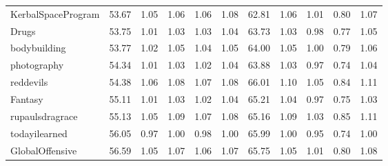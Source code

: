 \begin{tabular}{lrrrrrrrrrr}
KerbalSpaceProgram  &          53.67 &                1.05 &                1.06 &                1.06 &                1.08 &                 62.81 &                       1.06 &                       1.01 &                       0.80 &                       1.07 \\
Drugs               &          53.75 &                1.01 &                1.03 &                1.03 &                1.04 &                 63.73 &                       1.03 &                       0.98 &                       0.77 &                       1.05 \\
bodybuilding        &          53.77 &                1.02 &                1.05 &                1.04 &                1.05 &                 64.00 &                       1.05 &                       1.00 &                       0.79 &                       1.06 \\
photography         &          54.34 &                1.01 &                1.03 &                1.02 &                1.04 &                 63.88 &                       1.03 &                       0.97 &                       0.74 &                       1.04 \\
reddevils           &          54.38 &                1.06 &                1.08 &                1.07 &                1.08 &                 66.01 &                       1.10 &                       1.05 &                       0.84 &                       1.11 \\
Fantasy             &          55.11 &                1.01 &                1.03 &                1.02 &                1.04 &                 65.21 &                       1.04 &                       0.97 &                       0.75 &                       1.03 \\
rupaulsdragrace     &          55.13 &                1.05 &                1.09 &                1.07 &                1.08 &                 65.16 &                       1.09 &                       1.03 &                       0.85 &                       1.11 \\
todayilearned       &          56.05 &                0.97 &                1.00 &                0.98 &                1.00 &                 65.99 &                       1.00 &                       0.95 &                       0.74 &                       1.00 \\
GlobalOffensive     &          56.59 &                1.05 &                1.07 &                1.06 &                1.07 &                 65.75 &                       1.05 &                       1.01 &                       0.80 &                       1.08 \\

\end{tabular}

